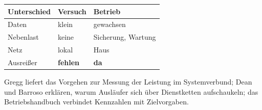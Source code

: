 \begin{aufgabe}
\begin{warnung}
\begin{center}
\renewcommand{\arraystretch}{1.5}
\begin{tabular}{@{}P{3.0cm}P{2.2cm}P{2.8cm}@{}}
\toprule
\textbf{Unterschied} & \textbf{Versuch} & \textbf{Betrieb}\\
\midrule
Daten & \textcolor{akzent}{klein} & \textcolor{gruen}{gewachsen}\\
Nebenlast & \textcolor{akzent}{keine} & \textcolor{gruen}{Sicherung, Wartung}\\
Netz & \textcolor{akzent}{lokal} & \textcolor{gruen}{Haus}\\
Ausreißer & \textcolor{akzent}{\textbf{fehlen}} & \textcolor{gruen}{\textbf{da}}\\
\bottomrule
\end{tabular}
\end{center}

\begin{center}
\begin{minipage}{0.88\textwidth}
\end{minipage}
\end{center}

\begin{center}
\end{center}
\end{warnung}
\end{aufgabe}
\vspace{-4pt}
\noindent Gregg liefert das Vor\-ge\-hen zur Mes\-sung der Leis\-tung im Sys\-tem\-ver\-bund; Dean und Barroso erklären, warum Aus\-läu\-fer sich über Dienst\-ket\-ten auf\-schau\-keln; das Be\-triebs\-hand\-buch verbindet Kenn\-zah\-len mit Ziel\-vor\-ga\-ben.
